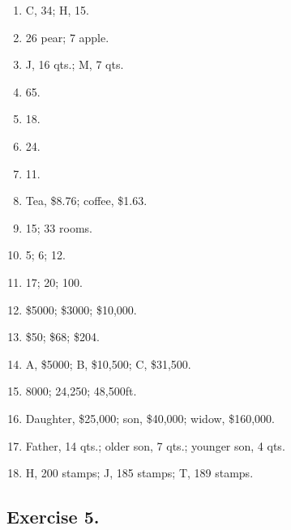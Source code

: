 \documentclass{book}
\begin{document}
\begin{enumerate}
\item C, 34; H, 15.

\item 26 pear; 7 apple.

\item J, 16 qts.; M, 7 qts.

\item 65.

\item 18.

\item 24.

\item 11.

\item Tea, \$8.76; coffee, \$1.63.

\item 15; 33 rooms.

\item 5; 6; 12.

\item 17; 20; 100.

\item \$5000; \$3000; \$10,000.

\item \$50; \$68; \$204.

\item A, \$5000; B, \$10,500; C, \$31,500.

\item 8000; 24,250; 48,500ft.

\item Daughter, \$25,000; son, \$40,000; widow, \$160,000.

\item Father, 14 qts.; older son, 7 qts.; younger son, 4 qts.

\item H, 200 stamps; J, 185 stamps; T, 189 stamps.

\end{enumerate}

\subsection*{Exercise 5.}
\end{document}
